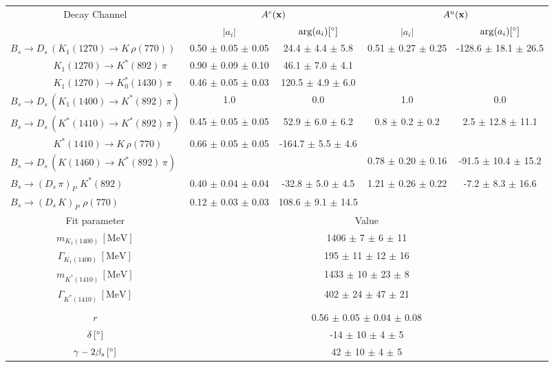 \begin{tabular}{l c c c c } 
\hline
\hline
\multicolumn{1}{c}{Decay Channel} & \multicolumn{2}{c}{$A^{c}(\mathbf{x})$} & \multicolumn{2}{c}{$A^{u}(\mathbf{x})$}  \\ 
 & \multicolumn{1}{c}{$\vert a_i \vert$}  & \multicolumn{1}{c}{$\arg(a_i) [^{\circ}]$}  & \multicolumn{1}{c}{$\vert a_i \vert$} & \multicolumn{1}{c}{$\arg(a_i) [^{\circ}]$} \\ 
\hline
$B_s \to D_s \, ( K_1(1270) \to K \, \rho(770) ) $ & 0.50 $\pm$ 0.05 $\pm$ 0.05 & 24.4 $\pm$ 4.4 $\pm$ 5.8 & 0.51 $\pm$ 0.27 $\pm$ 0.25 & -128.6 $\pm$ 18.1 $\pm$ 26.5 \\ 
$\phantom{B_s \to D_s \, (} K_1(1270) \to K^{*}(892) \, \pi \phantom{)} $ & 0.90 $\pm$ 0.09 $\pm$ 0.10 & 46.1 $\pm$ 7.0 $\pm$ 4.1 &  &  \\ 
$\phantom{B_s \to D_s \, (} K_1(1270) \to K^{*}_{0}(1430) \, \pi \phantom{)} $ & 0.46 $\pm$ 0.05 $\pm$ 0.03 & 120.5 $\pm$ 4.9 $\pm$ 6.0 &  &  \\ 
 $B_s \to D_s \, ( K_1(1400) \to K^{*}(892) \, \pi ) $ &  1.0 & 0.0 & 1.0 & 0.0  \\ 
$B_s \to D_s \, ( K^{*}(1410) \to K^{*}(892) \, \pi ) $ & 0.45 $\pm$ 0.05 $\pm$ 0.05 & 52.9 $\pm$ 6.0 $\pm$ 6.2 & 0.8 $\pm$ 0.2 $\pm$ 0.2 & 2.5 $\pm$ 12.8 $\pm$ 11.1 \\ 
$\phantom{B_s \to D_s \, (} K^{*}(1410) \to K \, \rho(770) \phantom{)} $ & 0.66 $\pm$ 0.05 $\pm$ 0.05 & -164.7 $\pm$ 5.5 $\pm$ 4.6 & &   \\ 
$B_s \to D_s \, ( K(1460) \to K^{*}(892) \, \pi ) $ & & &0.78 $\pm$ 0.20 $\pm$ 0.16 & -91.5 $\pm$ 10.4 $\pm$ 15.2 \\ 
$B_s \to ( D_s \, \pi)_{P} \, \, K^{*}(892) $ & 0.40 $\pm$ 0.04 $\pm$ 0.04 & -32.8 $\pm$ 5.0 $\pm$ 4.5 & 1.21 $\pm$ 0.26 $\pm$ 0.22 & -7.2 $\pm$ 8.3 $\pm$ 16.6 \\ 
$B_s \to ( D_s \, K)_{P} \, \, \rho(770) $ & 0.12 $\pm$ 0.03 $\pm$ 0.03 & 108.6 $\pm$ 9.1 $\pm$ 14.5 & & \\ 
\hline
\hline
\multicolumn{1}{c}{Fit parameter} & \multicolumn{4}{c}{Value}  \\ 
\hline
\multicolumn{1}{c}{$m_{K_1(1400)} \, [\text{MeV}]$} & \multicolumn{4}{c}{1406 $\pm$ 7 $\pm$ 6 $\pm$ 11} \\ 
\multicolumn{1}{c}{$\Gamma_{K_1(1400)} \, [\text{MeV}]$} & \multicolumn{4}{c}{195 $\pm$ 11 $\pm$ 12 $\pm$ 16} \\ 
\multicolumn{1}{c}{$m_{K^{*}(1410)} \, [\text{MeV}]$} & \multicolumn{4}{c}{1433 $\pm$ 10 $\pm$ 23 $\pm$ 8} \\ 
\multicolumn{1}{c}{$\Gamma_{K^{*}(1410)} \, [\text{MeV}]$} & \multicolumn{4}{c}{402 $\pm$ 24 $\pm$ 47 $\pm$ 21} \\ 
 \\ 
\multicolumn{1}{c}{$r$} & \multicolumn{4}{c}{0.56 $\pm$ 0.05 $\pm$ 0.04 $\pm$ 0.08} \\ 
\multicolumn{1}{c}{$\delta \, [^{\circ}]$} & \multicolumn{4}{c}{-14 $\pm$ 10 $\pm$ 4 $\pm$ 5} \\ 
\multicolumn{1}{c}{$\gamma - 2 \beta_{s} \, [^{\circ}]$} & \multicolumn{4}{c}{42 $\pm$ 10 $\pm$ 4 $\pm$ 5} \\ 
\hline
\hline
\end{tabular}
